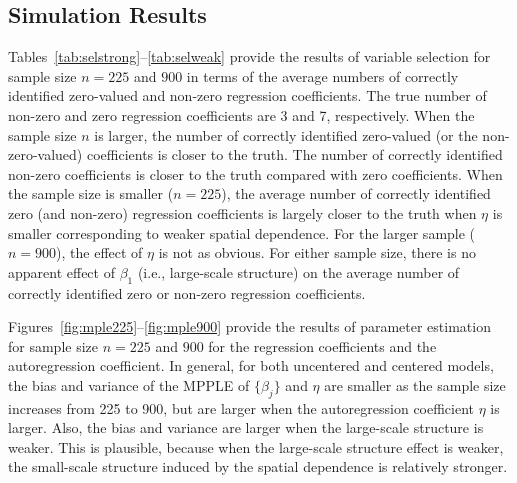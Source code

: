 \documentclass[authoryear,review, 12pt]{elsarticle}
\begin{document}
\subsection{Simulation Results}

Tables~\ref{tab:selstrong}--\ref{tab:selweak} provide the results of variable selection for sample size $n=225$ and $900$ in terms of the average numbers of correctly identified zero-valued and non-zero regression coefficients. The true number of non-zero and zero regression coefficients are 3 and 7, respectively.  
When the sample size $n$ is larger, the number of correctly identified zero-valued (or the non-zero-valued) coefficients is closer to the truth. The number of correctly identified non-zero coefficients is closer to the truth compared with zero coefficients. 
When the sample size is smaller ($n=225$), the average number of correctly identified zero (and non-zero) regression coefficients
is largely closer to the truth when $\eta$ is smaller corresponding to weaker spatial dependence.  For the larger sample ($n=900$), the effect of $\eta$ is not as obvious.
For either sample size, there is no apparent effect of $\beta_1$ (i.e., large-scale structure) on the average number of correctly identified zero or non-zero regression coefficients.


Figures~\ref{fig:mple225}--\ref{fig:mple900} provide the results of parameter estimation for sample size $n=225$ and $900$ for the regression coefficients and the autoregression coefficient.  
In general, for both uncentered and centered models, the bias and variance of the MPPLE of $\{\beta_j\}$ and $\eta$ are smaller as the sample size increases from 225 to 900,
but are larger when the autoregression coefficient $\eta$ is larger.
Also, the bias and variance are larger when the large-scale structure is weaker.  This is plausible, because when the  large-scale structure effect is weaker, the  small-scale structure induced by the spatial dependence is relatively stronger.  

\end{document}
